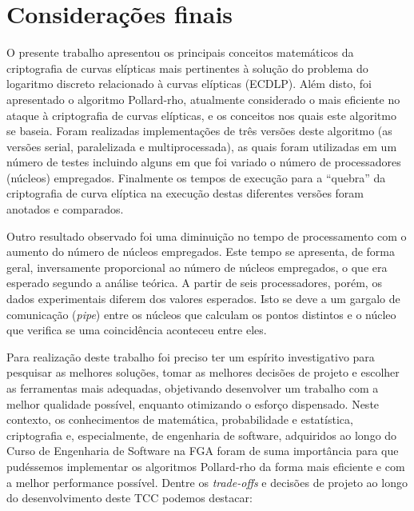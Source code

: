 \chapter{Considerações finais}
O presente trabalho apresentou os principais conceitos matemáticos da criptografia de curvas elípticas mais pertinentes à solução do problema do logaritmo discreto relacionado à curvas elípticas (ECDLP). Além disto, foi apresentado o algoritmo Pollard-rho, atualmente considerado o mais eficiente no ataque à criptografia de curvas elípticas, e os conceitos nos quais este algoritmo se baseia. Foram realizadas implementações de três versões deste algoritmo (as versões serial, paralelizada e multiprocessada), as quais foram utilizadas em um número de testes incluindo alguns em que foi variado o número de processadores (núcleos) empregados. Finalmente os tempos de execução para a ``quebra'' da criptografia de curva elíptica na execução destas diferentes versões foram anotados e comparados.

Outro resultado observado foi uma diminuição no tempo de processamento com o aumento do número de núcleos empregados. Este tempo se apresenta, de forma geral, inversamente proporcional ao número de núcleos empregados, o que era esperado segundo a análise teórica. A partir de seis processadores, porém, os dados experimentais diferem dos valores esperados. Isto se deve a um gargalo de comunicação (\textit{pipe}) entre os núcleos que calculam os pontos distintos e o núcleo que verifica se uma coincidência aconteceu entre eles.

Para realização deste trabalho foi preciso ter um espírito investigativo para pesquisar as melhores soluções, tomar as melhores decisões de projeto e escolher as ferramentas mais adequadas, objetivando desenvolver um trabalho com a melhor qualidade possível, enquanto otimizando o esforço dispensado. Neste contexto, os conhecimentos de matemática, probabilidade e estatística, criptografia e, especialmente, de engenharia de software, adquiridos ao longo do Curso de Engenharia de Software na FGA foram de suma importância para que pudéssemos implementar os algoritmos Pollard-rho da forma mais eficiente e com a melhor performance possível. Dentre os \textit{trade-offs} e decisões de projeto ao longo do desenvolvimento deste TCC podemos destacar:

